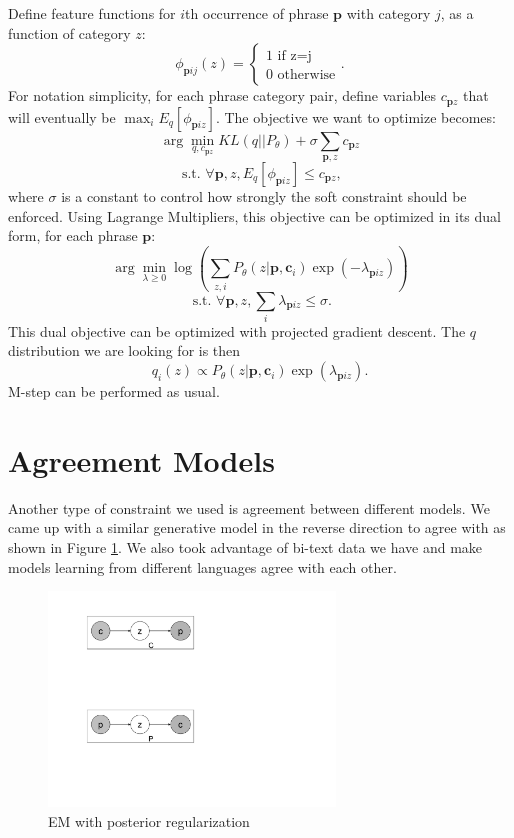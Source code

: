 Define feature functions for $i$th occurrence of phrase $\textbf{p}$
with category $j$,
as a function of category $z$:
\[
\phi_{\textbf{p}ij}(z)=
\begin{cases}
1\text{ if z=j}\\
0\text{ otherwise}
\end{cases}.
\]
For notation simplicity, for
each phrase category pair, 
define variables $c_{\textbf{p}z}$ that will
eventually be $\max_i E_q[\phi_{\textbf{p}iz}]$.
The objective we want to optimize becomes:
\[
\arg\min_{q,c_{\textbf{p}z}} KL(q||P_{\theta}) + 
\sigma \sum_{\textbf{p},z}c_{\textbf{p}z}
\]
\[
\text{ s.t. }\forall \textbf{p},z,
E_q[\phi_{\textbf{p}iz}]\leq c_{\textbf{p}z},
\]
where $\sigma$ is a constant to control
how strongly the soft constraint should
be enforced.
Using Lagrange Multipliers, this objective can
be optimized in its dual form,
for each phrase $\textbf{p}$:
\[
\arg\min_{\lambda\geq 0} \log 
(\sum_{z,i} P_\theta(z|\textbf{p},\textbf{c}_i)
\exp (-\lambda_{\textbf{p}iz}))
\]
\[
\text{ s.t. } \forall \textbf{p},z,
\sum_i \lambda_{\textbf{p}iz}\leq \sigma.
\]
This dual objective can be optimized with projected gradient
descent.
The $q$ distribution we are looking for is then
\[
q_i(z)\propto P_{\theta}(z|\textbf{p},\textbf{c}_i)
\exp(\lambda_{\textbf{p}iz}).
\]
M-step can be performed as usual.
\section{Agreement Models}\label{sec:pr-agree}
Another type of constraint we used is agreement between
different models. We came up with a similar generative
model in the reverse direction to agree with 
as shown in Figure \ref{fig:EMreverse}. We also
took advantage of bi-text data we have and make models
learning from different languages agree with each other.

\begin{figure}[h]
  \centering
  \includegraphics[width=3.0in]{pr-clustering/EMreverse}
  \caption{EM with posterior regularization}
  \label{fig:EMreverse}
\end{figure}

